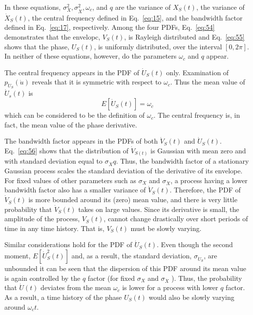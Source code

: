 \documentclass[12pt]{article}
\begin{document}
In these equations, $\sigma_{X}^{2}, \sigma_{\dot{X}}^{2}, \omega_{c}$, and $q$ are the variance of $X_{S}(t)$, the variance of $\dot{X}_{S}(t)$, the central frequency defined in Eq.~\eqref{eq:15}, and the bandwidth factor defined in Eq.~\eqref{eq:17}, respectively. Among the four PDFs, Eq.~\eqref{eq:54} demonstrates that the envelopc, $V_{S}(t)$, is Rayleigh distributed and Eq.~\eqref{eq:55} shows that the phase, $U_{S}(t)$, is uniformly distributed, over the interval $[0,2 \pi]$. In neither of these equations, however, do the parameters $\omega_{c}$ and $q$ appear.

The central frequency appears in the PDF of $\dot{U}_{S}(t)$ only. Examination of $p_{\dot{U}_{S}}(\dot{u})$ reveals that it is symmetric with respect to $\omega_{c}$. Thus the mean value of $\dot{U}_{s}(t)$ is
\begin{equation}
E\left[\dot{U}_{S}(t)\right]=\omega_{c}
\label{eq:58}
\end{equation}
which can be considered to be the definition of $\omega_{c}$. The central frequency is, in fact, the mean value of the phase derivative.

The bandwidth factor appears in the PDFs of both $\dot{V}_{S}(t)$ and $\dot{U}_{S}(t)$. Eq.~\eqref{eq:56} shows that the distribution of $\dot{V}_{S(t)}$ is Gaussian with mean zero and with standard deviation equal to $\sigma_{\dot{X}} q$. Thus,
the bandwidth factor of a stationary Gaussian process scales the standard deviation of the derivative of its envelope. For fixed values of other parameters such as $\sigma_{X}$ and $\sigma_{\dot{X}}$, a process having a lower bandwidth factor also has a smaller variance of $\dot{V}_{S}(t)$. Therefore, the PDF of $\dot{V}_{S}(t)$ is more bounded around its (zero) mean value, and there is very little probability that $\dot{V}_{S}(t)$ takes on large values. Since its derivative is small, the amplitude of the process, $V_{S}(t)$, cannot change drastically over short periods of time in any time history. That is, $V_{S}(t)$ must be slowly varying.

Similar considerations hold for the PDF of $\dot{U}_{S}(t)$. Even though the second moment, $E\left[\dot{U}_{S}^{2}(t)\right]$ and, as a result, the standard deviation, $\sigma_{\dot{U}_{S}}$, are unbounded it can be seen that the dispersion of this PDF around its mean value is again controlled by the $q$ factor (for fixed $\sigma_{X}$ and $\sigma_{\dot{X}}$ ). Thus, the probability that $\dot{U}(t)$ deviates from the mean $\omega_{c}$ is lower for a process with lower $q$ factor. As a result, a time history of the phase $U_{S}(t)$ would also be slowly varying around $\omega_{c} t$.
\end{document}
